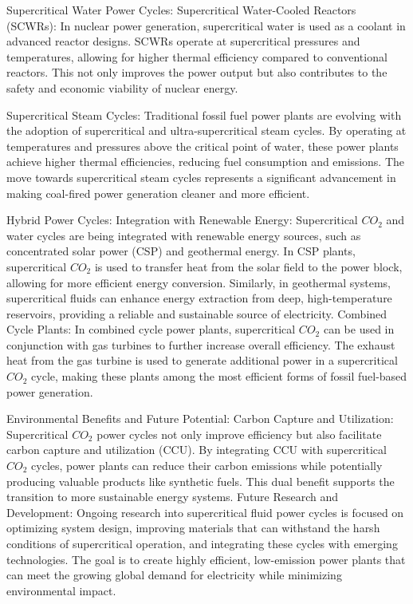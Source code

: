     Supercritical Water Power Cycles: Supercritical Water-Cooled Reactors
        (SCWRs): In nuclear power generation, supercritical water is used as a
        coolant in advanced reactor designs. SCWRs operate at supercritical
        pressures and temperatures, allowing for higher thermal efficiency
        compared to conventional reactors. This not only improves the power
        output but also contributes to the safety and economic viability of
        nuclear energy.

    Supercritical Steam Cycles: Traditional fossil fuel power plants are
        evolving with the adoption of supercritical and ultra-supercritical
        steam cycles. By operating at temperatures and pressures above the
        critical point of water, these power plants achieve higher thermal
        efficiencies, reducing fuel consumption and emissions. The move towards
        supercritical steam cycles represents a significant advancement in
        making coal-fired power generation cleaner and more efficient.
		
    Hybrid Power Cycles: Integration with Renewable Energy: Supercritical $CO_2$
        and water cycles are being integrated with renewable energy sources,
        such as concentrated solar power (CSP) and geothermal energy. In CSP
        plants, supercritical $CO_2$ is used to transfer heat from the solar field
        to the power block, allowing for more efficient energy conversion.
        Similarly, in geothermal systems, supercritical fluids can enhance
        energy extraction from deep, high-temperature reservoirs, providing a
        reliable and sustainable source of electricity. Combined Cycle Plants:
        In combined cycle power plants, supercritical $CO_2$ can be used in
        conjunction with gas turbines to further increase overall efficiency.
        The exhaust heat from the gas turbine is used to generate additional
        power in a supercritical $CO_2$ cycle, making these plants among the most
        efficient forms of fossil fuel-based power generation.

    Environmental Benefits and Future Potential: Carbon Capture and Utilization:
        Supercritical $CO_2$ power cycles not only improve efficiency but also
        facilitate carbon capture and utilization (CCU). By integrating CCU with
        supercritical $CO_2$ cycles, power plants can reduce their carbon emissions
        while potentially producing valuable products like synthetic fuels. This
        dual benefit supports the transition to more sustainable energy systems.
        Future Research and Development: Ongoing research into supercritical
        fluid power cycles is focused on optimizing system design, improving
        materials that can withstand the harsh conditions of supercritical
        operation, and integrating these cycles with emerging technologies. The
        goal is to create highly efficient, low-emission power plants that can
        meet the growing global demand for electricity while minimizing
        environmental impact.

